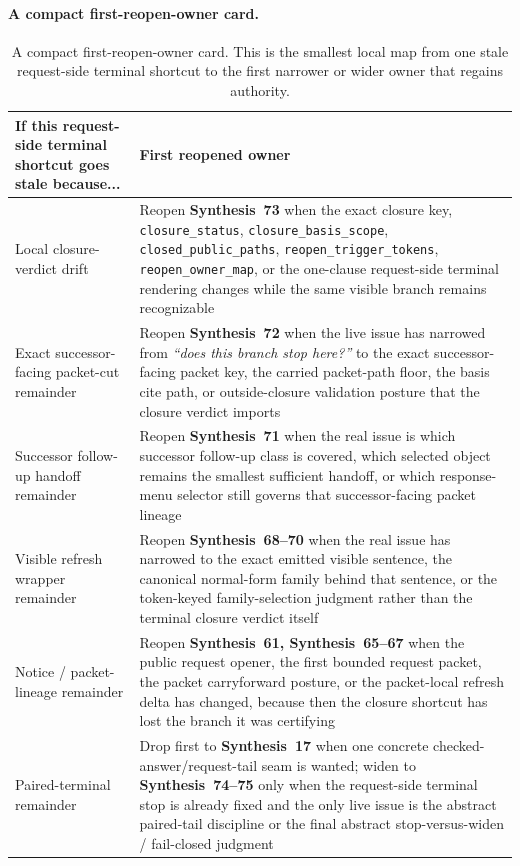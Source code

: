 \documentclass[11pt]{article}
\begin{document}
\paragraph{A compact first-reopen-owner card.}
\begin{table}[t]
\centering
\small
\begin{tabularx}{\linewidth}{@{}lX@{}}
\toprule
If this request-side terminal shortcut goes stale because... & First reopened owner \\
\midrule
Local closure-verdict drift & Reopen \textbf{Synthesis~73} when the exact closure key, \nolinkurl{closure_status}, \nolinkurl{closure_basis_scope}, \nolinkurl{closed_public_paths}, \nolinkurl{reopen_trigger_tokens}, \nolinkurl{reopen_owner_map}, or the one-clause request-side terminal rendering changes while the same visible branch remains recognizable \\
Exact successor-facing packet-cut remainder & Reopen \textbf{Synthesis~72} when the live issue has narrowed from \emph{``does this branch stop here?''} to the exact successor-facing packet key, the carried packet-path floor, the basis cite path, or outside-closure validation posture that the closure verdict imports \\
Successor follow-up handoff remainder & Reopen \textbf{Synthesis~71} when the real issue is which successor follow-up class is covered, which selected object remains the smallest sufficient handoff, or which response-menu selector still governs that successor-facing packet lineage \\
Visible refresh wrapper remainder & Reopen \textbf{Synthesis~68--70} when the real issue has narrowed to the exact emitted visible sentence, the canonical normal-form family behind that sentence, or the token-keyed family-selection judgment rather than the terminal closure verdict itself \\
Notice / packet-lineage remainder & Reopen \textbf{Synthesis~61, Synthesis~65--67} when the public request opener, the first bounded request packet, the packet carryforward posture, or the packet-local refresh delta has changed, because then the closure shortcut has lost the branch it was certifying \\
Paired-terminal remainder & Drop first to \textbf{Synthesis~17} when one concrete checked-answer/request-tail seam is wanted; widen to \textbf{Synthesis~74--75} only when the request-side terminal stop is already fixed and the only live issue is the abstract paired-tail discipline or the final abstract stop-versus-widen / fail-closed judgment \\
\bottomrule
\end{tabularx}
\caption{A compact first-reopen-owner card. This is the smallest local map from one stale request-side terminal shortcut to the first narrower or wider owner that regains authority.}
\label{tab:first-reopen-owner-card}
\end{table}
\end{document}
